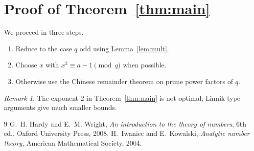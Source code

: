 \documentclass{amsart}
\theoremstyle{definition}
\theoremstyle{remark}
\newtheorem{remark}[theorem]{Remark}
\begin{document}
\section{Proof of Theorem~\ref{thm:main}}
We proceed in three steps.
\begin{enumerate}[label=\textup{(\roman*)}]
  \item Reduce to the case $q$ odd using Lemma~\ref{lem:mult}.
  \item Choose $x$ with $x^2\equiv a-1\pmod q$ when possible.
  \item Otherwise use the Chinese remainder theorem on prime power factors of $q$.
\end{enumerate}

\begin{remark}
The exponent $2$ in Theorem~\ref{thm:main} is not optimal; Linnik-type arguments give
much smaller bounds.
\end{remark}


\begin{thebibliography}{9}
 G.~H. Hardy and E.~M. Wright, \emph{An introduction to the theory of
numbers}, 6th ed., Oxford University Press, 2008.
 H.~Iwaniec and E.~Kowalski, \emph{Analytic number theory}, American
Mathematical Society, 2004.
\end{thebibliography}
\end{document}
